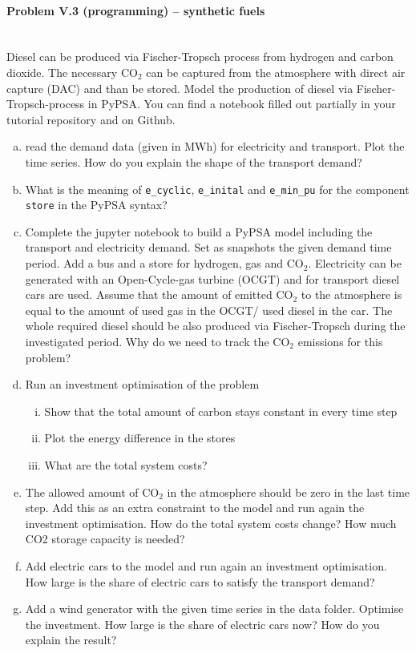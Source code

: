 \documentclass[11pt,a4paper,fleqn]{scrartcl}
\begin{document}
\newpage

\paragraph{Problem V.3 (programming) -- synthetic fuels \faHome}~\\
Diesel can be produced via Fischer-Tropsch process from hydrogen and carbon dioxide. The necessary CO$_2$ can be captured from the atmosphere with direct air capture (DAC) and than be stored. Model the production of diesel via Fischer-Tropsch-process in PyPSA. You can find a notebook filled out partially in your tutorial repository and on Github.
\begin{enumerate}[(a)]
	\item  read the demand data (given in MWh) for electricity and transport. Plot the time series. How do you explain the shape of the transport demand?
	\item What is the meaning of \texttt{e\_cyclic}, \texttt{e\_inital} and \texttt{e\_min\_pu} for the component \texttt{store} in the PyPSA syntax?
	\item Complete the jupyter notebook to build a PyPSA model including the transport and electricity demand. Set as snapshots the given demand time period. Add a bus and a store for hydrogen, gas and CO$_2$. Electricity can be generated with
an Open-Cycle-gas turbine (OCGT) and for transport diesel cars are used. Assume that the amount of emitted CO$_2$ to the atmosphere is equal to the amount of used gas in the OCGT/ used diesel in the car. The whole required diesel should be also produced via Fischer-Tropsch during the investigated period. Why do we need to track the CO$_2$ emissions for this problem?
	\item Run an investment optimisation of the problem
		\begin{enumerate}[(i)]
		\item Show that the total amount of carbon stays constant in every time step
		\item Plot the energy difference in the stores
		\item What are the total system costs?
		\end{enumerate}
	\item The allowed amount of CO$_2$ in the atmosphere should be zero in the last time step. Add this as an extra constraint to the model and run again the investment optimisation. How do the total system costs change? How much CO2 storage capacity is needed?
	\item Add electric cars to the model and run again an investment optimisation. How large is the share of electric cars to satisfy the transport demand?
	\item Add a wind generator with the given time series in the data folder. Optimise the investment. How large is the share of electric cars now? How do you explain the result?
\end{enumerate} 
\end{document}
